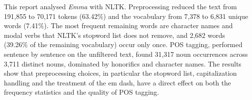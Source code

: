 \documentclass[sigconf]{acmart}
\begin{document}
This report analysed \textit{Emma} with NLTK. Preprocessing reduced the
text from 191,855 to 70,171 tokens (63.42\%) and the vocabulary from 7,378
to 6,831 unique words (7.41\%). The most frequent remaining words are
character names and modal verbs that NLTK's stopword list does not remove,
and 2,682 words (39.26\% of the remaining vocabulary) occur only once. POS
tagging, performed sentence by sentence on the unfiltered text, found
31,317 noun occurrences across 3,711 distinct nouns, dominated by
honorifics and character names. The results show that preprocessing choices,
in particular the stopword list, capitalization handling and the treatment
of the em dash, have a direct effect on both the frequency statistics and
the quality of POS tagging.
\end{document}
